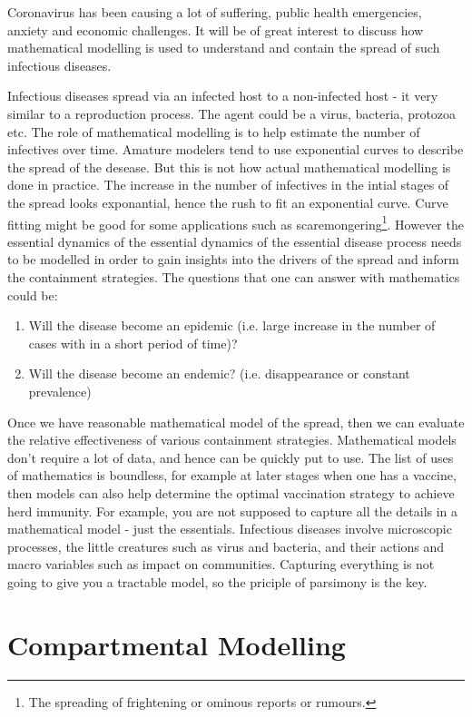 \documentclass[fontsize=17pt]{article}
\begin{document}
Coronavirus has been causing a lot of suffering, public health emergencies, anxiety and economic challenges. It will be of great interest to discuss how mathematical modelling is used to understand and contain the spread of such infectious diseases.

Infectious diseases spread via an infected host to a non-infected host - it very similar to a reproduction process. The agent could be a virus, bacteria, protozoa etc. The role of mathematical modelling is to help estimate the number of infectives over time. Amature modelers tend to use exponential curves to describe the spread of the desease. But this is not how actual mathematical modelling is done in practice. The increase in the number of infectives in the intial stages of the spread looks exponantial, hence the rush to fit an exponential curve. Curve fitting might be good for some applications such as scaremongering\footnote{The spreading of frightening or ominous reports or rumours.}. However the essential dynamics of the essential dynamics of the essential disease process needs to be modelled in order to gain insights into the drivers of the spread and inform the containment strategies.
The questions that one can answer with mathematics could be:
\begin{enumerate}
	\item Will the disease become an epidemic (i.e. large increase in the number of cases with in a short period of time)?
	\item Will the disease become an endemic? (i.e. disappearance or constant prevalence) 
\end{enumerate} 

Once we have reasonable mathematical model of the spread, then we can evaluate the relative effectiveness of various containment strategies. Mathematical models don't require a lot of data, and hence can be quickly put to use. The list of uses of mathematics is boundless, for example at later stages when one has a vaccine, then models can also help determine the optimal vaccination strategy to achieve herd immunity. For example, you are not supposed to capture all the details in a mathematical model - just the essentials. Infectious diseases involve microscopic processes, the little creatures such as virus and bacteria, and their actions and macro variables such as impact on communities. Capturing everything is not going to give you a tractable model, so the priciple of parsimony is the key.

\section{Compartmental Modelling}
\end{document}
